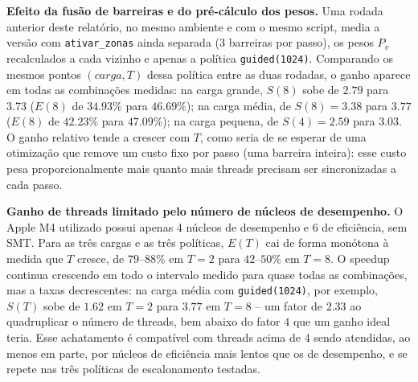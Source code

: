 \documentclass[12pt,a4paper]{article}
\begin{document}
\textbf{Efeito da fusão de barreiras e do pré-cálculo dos pesos.} Uma
rodada anterior deste relatório, no mesmo ambiente e com o mesmo script,
media a versão com \texttt{ativar\_zonas} ainda separada (3 barreiras por
passo), os pesos $P_v$ recalculados a cada vizinho e apenas a política
\texttt{guided(1024)}. Comparando os mesmos pontos $(carga,T)$ dessa
política entre as duas rodadas, o ganho aparece em todas as combinações
medidas: na carga grande, $S(8)$ sobe de $2.79$ para $3.73$ ($E(8)$ de
$34.93\%$ para $46.69\%$); na carga média, de $S(8)=3.38$ para $3.77$
($E(8)$ de $42.23\%$ para $47.09\%$); na carga pequena, de $S(4)=2.59$
para $3.03$. O ganho relativo tende a crescer com $T$, como seria de se
esperar de uma otimização que remove um custo fixo por passo (uma
barreira inteira): esse custo pesa proporcionalmente mais quanto mais
threads precisam ser sincronizadas a cada passo.

\textbf{Ganho de threads limitado pelo número de núcleos de desempenho.}
O Apple M4 utilizado possui apenas 4 núcleos de desempenho e 6 de
eficiência, sem SMT. Para as três cargas e as três políticas, $E(T)$ cai
de forma monótona à medida que $T$ cresce, de $79$--$88\%$ em $T=2$ para
$42$--$50\%$ em $T=8$. O speedup continua crescendo em todo o intervalo
medido para quase todas as combinações, mas a taxas decrescentes: na
carga média com \texttt{guided(1024)}, por exemplo, $S(T)$ sobe de
$1.62$ em $T=2$ para $3.77$ em $T=8$ -- um fator de $2.33$ ao
quadruplicar o número de threads, bem abaixo do fator $4$ que um ganho
ideal teria. Esse achatamento é compatível com threads acima de 4 sendo
atendidas, ao menos em parte, por núcleos de eficiência mais lentos que
os de desempenho, e se repete nas três políticas de escalonamento
testadas.
\end{document}
